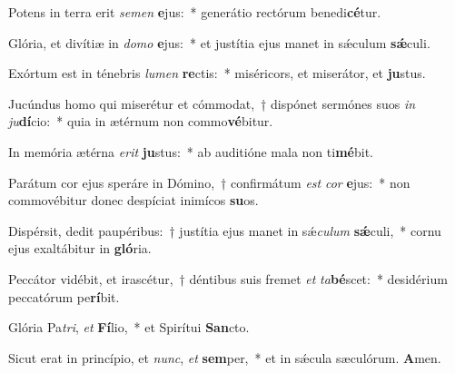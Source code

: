 ﻿\item Potens in terra erit \textit{se}\textit{men} \textbf{e}jus:~* generátio rectórum benedi\textbf{cé}tur.

\item Glória, et divítiæ in \textit{do}\textit{mo} \textbf{e}jus:~* et justítia ejus manet in sǽculum \textbf{sǽ}culi.

\item Exórtum est in ténebris \textit{lu}\textit{men} \textbf{re}ctis:~* miséricors, et miserátor, et \textbf{ju}stus.

\item Jucúndus homo qui miserétur et cómmodat,~† dispónet sermónes suos \textit{in} \textit{ju}\textbf{dí}cio:~* quia in ætérnum non commo\textbf{vé}bitur.

\item In memória ætérna \textit{e}\textit{rit} \textbf{ju}stus:~* ab auditióne mala non ti\textbf{mé}bit.

\item Parátum cor ejus speráre in Dómino,~† confirmátum \textit{est} \textit{cor} \textbf{e}jus:~* non commovébitur donec despíciat inimícos \textbf{su}os.

\item Dispérsit, dedit paupéribus:~† justítia ejus manet in sǽ\textit{cu}\textit{lum} \textbf{sǽ}culi,~* cornu ejus exaltábitur in \textbf{gló}ria.

\item Peccátor vidébit, et irascétur,~† déntibus suis fremet \textit{et} \textit{ta}\textbf{bé}scet:~* desidérium peccatórum pe\textbf{rí}bit.

\item Glória Pa\textit{tri}, \textit{et} \textbf{Fí}lio,~* et Spirítui \textbf{San}cto.

\item Sicut erat in princípio, et \textit{nunc}, \textit{et} \textbf{sem}per,~* et in sǽcula sæculórum. \textbf{A}men.